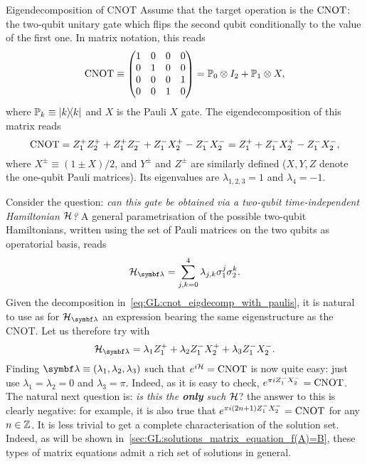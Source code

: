 \begin{examplebox}[label={ex:GL:eigendecomposition_cnot}]{Eigendecomposition of CNOT}
Assume that the target operation is the $\operatorname{CNOT}$: the two-qubit unitary gate which flips the second qubit conditionally to the value of the first one.
In matrix notation, this reads
\begin{equation}
    \operatorname{CNOT} \equiv\begin{pmatrix}1&0&0&0 \\ 0&1&0&0 \\ 0&0&0&1\\0&0&1&0\end{pmatrix} =
    {\mathbb{P}}_0\otimes I_2 + {\mathbb{P}}_1\otimes X,
\end{equation}
where ${\mathbb{P}}_k\equiv\ketbra k$ and $X$ is the Pauli $X$ gate.
The eigendecomposition of this matrix reads
\begin{equation}
    \operatorname{CNOT} =
    Z^+_1 Z^+_2 + Z^+_1 Z^-_2
    + Z^-_1 X^+_2
    - Z^-_1 X^-_2
    = Z_1^+ + Z_1^- X_2^+ - Z_1^- X_2^-,
    \label{eq:GL:cnot_eigdecomp_with_paulis}
\end{equation}
where $X^\pm\equiv(1\pm X)/2$, and $Y^\pm$ and $Z^\pm$ are similarly defined ($X,Y,Z$ denote the one-qubit Pauli matrices).
Its eigenvalues are $\lambda_{1,2,3}=1$ and $\lambda_4=-1$.

Consider the question: \emph{can this gate be obtained via a two-qubit time-independent Hamiltonian ${\mathcal{H}}$?}
A general parametrisation of the possible two-qubit Hamiltonians, written using the set of Pauli matrices on the two qubits as operatorial basis, reads
\begin{equation}
    \calH_\bslambda =
    \sum_{j,k=0}^4 \lambda_{j,k} \sigma^j_1\sigma^k_2.
\end{equation}
Given the decomposition in~\cref{eq:GL:cnot_eigdecomp_with_paulis}, it is natural to use as \ansatz for $\calH_\bslambda$ an expression bearing the same eigenstructure as the CNOT. Let us therefore try with
\begin{equation}
    \calH_\bslambda = \lambda_1 Z_1^+ + \lambda_2 Z_1^- X_2^+ + \lambda_3 Z_1^- X_2^-.
\end{equation}
Finding $\bslambda\equiv(\lambda_1,\lambda_2,\lambda_3)$ such that $e^{i{\mathcal{H}}}=\operatorname{CNOT}$ is now quite easy: just use $\lambda_1=\lambda_2=0$ and $\lambda_3=\pi$. Indeed, as it is easy to check, $e^{\pi i Z_1^- X_2^-} = \operatorname{CNOT}$.
The natural next question is: \emph{is this the \textbf{only} such ${\mathcal{H}}$}? the answer to this is clearly negative: for example, it is also true that $e^{\pi i (2n+1) Z_1^- X_2^-}=\operatorname{CNOT}$ for any $n\in{\mathbb{Z}}$.
It is less trivial to get a complete characterisation of the solution set.
Indeed, as will be shown in~\cref{sec:GL:solutions_matrix_equation_f(A)=B}, these types of matrix equations admit a rich set of solutions in general.
\end{examplebox}

